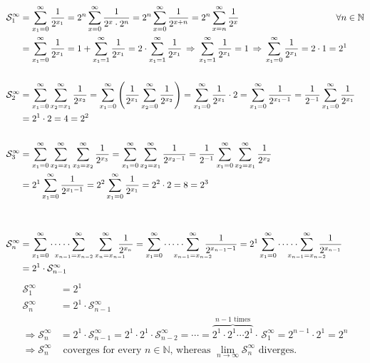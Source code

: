 \documentclass[12pt, a4paper]{article}
\begin{document}
\begin{align*}
\mathcal{S}_{1}^\infty &= \sum^{\infty}_{x_1 = 0} \frac{1}{2^{x_1}} = 2^n \sum^{\infty}_{x = 0} \frac{1}{2^{x}\cdot 2^n} = 2^n \sum^{\infty}_{x = 0} \frac{1}{2^{x+n}} = 2^n \sum^{\infty}_{x = n} \frac{1}{2^{x}} & \mathllap{\forall n\in\mathbb{N}}\\
&= \sum^{\infty}_{x_1 = 0} \frac{1}{2^{x_1}} = 1+ \sum^{\infty}_{x_1 = 1} \frac{1}{2^{x_1}} = 2 \cdot\sum^{\infty}_{x_1 = 1} \frac{1}{2^{x_1}} \,\Rightarrow\, \sum^{\infty}_{x_1 = 1} \frac{1}{2^{x_1}} = 1 \,\Rightarrow\, \sum^{\infty}_{x_1 = 0} \frac{1}{2^{x_1}} = 2\cdot 1 = 2^1\\
~\\
\mathcal{S}_{2}^\infty &= \sum^{\infty}_{x_1 = 0}\sum^{\infty}_{x_2 = x_1} \frac{1}{2^{x_2}} = \sum^{\infty}_{x_1 = 0} \left(\frac{1}{2^{x_1}}  \sum^{\infty}_{x_2 = 0} \frac{1}{2^{x_2}} \right) = \sum^{\infty}_{x_1 = 0} \frac{1}{2^{x_1}} \cdot 2 = \sum^{\infty}_{x_1 = 0}\frac{1}{2^{x_1-1}} = \frac{1}{2^{-1}}\sum^{\infty}_{x_1 = 0}\frac{1}{2^{x_1}} \\
&= 2^1 \cdot 2 = 4 = 2^2 \\
~\\
\mathcal{S}_{3}^\infty &= \sum^{\infty}_{x_1 = 0}\sum^{\infty}_{x_2 = x_1}\sum^{\infty}_{x_3 = x_2} \frac{1}{2^{x_3}} = \sum^{\infty}_{x_1 = 0}\sum^{\infty}_{x_2 = x_1} \frac{1}{2^{x_2-1}} = \frac{1}{2^{-1}}\sum^{\infty}_{x_1 = 0}\sum^{\infty}_{x_2 = x_1} \frac{1}{2^{x_2}}\\
&= 2^1\sum^{\infty}_{x_1 = 0} \frac{1}{2^{x_1-1}} = 2^2\sum^{\infty}_{x_1 = 0} \frac{1}{2^{x_1}} = 2^2\cdot 2 = 8 = 2^3\\
~\\~\\
\mathcal{S}_{n}^\infty &= \sum^{\infty}_{x_1 = 0}\cdots\cdot\cdot\hspace{-0.65cm}\sum^{\infty}_{x_{n-1} = x_{n-2~~~}}\hspace{-0.7cm}\sum^{\infty}_{~~~x_n = x_{n-1}}\hspace{-0.35cm}\frac{1}{2^{x_n}} = \sum^{\infty}_{x_1 = 0}\cdots\cdot\cdot\hspace{-0.45cm}\sum^{\infty}_{x_{n-1} = x_{n-2}}\hspace{-0.35cm}\frac{1}{2^{x_{n-1}-1}} = 2^1\sum^{\infty}_{x_1 = 0}\cdots\cdot\cdot\hspace{-0.45cm}\sum^{\infty}_{x_{n-1} = x_{n-2}}\hspace{-0.35cm}\frac{1}{2^{x_{n-1}}}\\
&= 2^1 \cdot \mathcal{S}_{n-1}^\infty
\end{align*}
\begin{align*}
\mathcal{S}_{1}^\infty &= 2^1\\
\mathcal{S}_{n}^\infty &= 2^1 \cdot \mathcal{S}_{n-1}^\infty\\
\Longrightarrow \mathcal{S}_{n}^\infty &= 2^1 \cdot \mathcal{S}_{n-1}^\infty = 2^1\cdot2^1 \cdot \mathcal{S}_{n-2}^\infty = \cdots = \overbrace{2^1\cdot2^1\cdots 2^1}^{n-1 \text{ times}} \cdot \,\mathcal{S}_{1}^\infty = 2^{n-1}\cdot2^1 = 2^n\\
\Longrightarrow \mathcal{S}_{n}^\infty &\text{ coverges for every $n\in \mathbb{N}$, whereas } \lim_{n\rightarrow\infty} \mathcal{S}_{n}^\infty \text{ diverges.} 
\end{align*}
\end{document}
